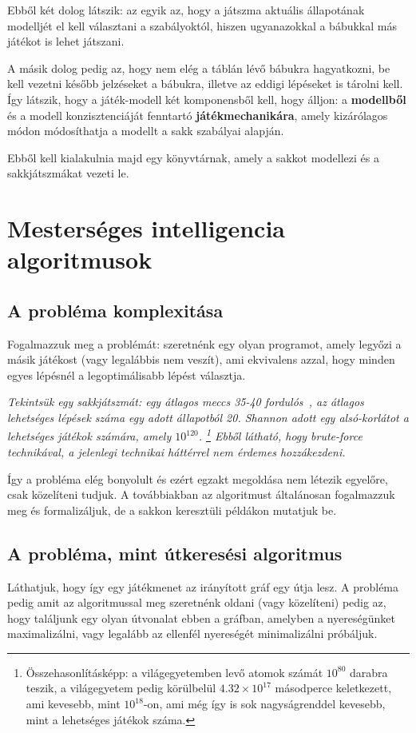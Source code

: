 \documentclass[twoside, a4paper, 12pt]{book}
\begin{document}
Ebből két dolog látszik: az egyik az, hogy a játszma aktuális állapotának modelljét el kell választani a szabályoktól, hiszen ugyanazokkal a bábukkal más játékot is lehet játszani.

A másik dolog pedig az, hogy nem elég a táblán lévő bábukra hagyatkozni, be kell vezetni később jelzéseket a bábukra, illetve az eddigi lépéseket is tárolni kell. Így látszik, hogy a játék-modell két komponensből kell, hogy álljon: a \textbf{modellből} és a modell konzisztenciáját fenntartó \textbf{játékmechanikára}, amely kizárólagos módon módosíthatja a modellt a sakk szabályai alapján.

Ebből kell kialakulnia majd egy könyvtárnak, amely a sakkot modellezi és a sakkjátszmákat vezeti le.

\section{Mesterséges intelligencia algoritmusok}
\subsection{A probléma komplexitása}
Fogalmazzuk meg a problémát: szeretnénk egy olyan programot, amely legyőzi a másik játékost (vagy legalábbis nem veszít), ami ekvivalens azzal, hogy minden egyes lépésnél a legoptimálisabb lépést választja.

\textit{Tekintsük egy sakkjátszmát: egy átlagos meccs 35-40 fordulós~\cite{averageLengthOfChessGame}\cite{averageLengthOfChessGame2}\cite{chessStatistics}, az átlagos lehetséges lépések száma egy adott állapotból 20\cite{shannonnumber}. Shannon adott egy alsó-korlátot a lehetséges játékok számára, amely $10^{120}$. \footnote{Összehasonlításképp: a világegyetemben levő atomok számát $10^{80}$ darabra teszik, a világegyetem pedig körülbelül $4.32 \times 10^{17}$ másodperce keletkezett, ami kevesebb, mint $10^{18}$-on, ami még így is sok nagyságrenddel kevesebb, mint a lehetséges játékok száma.} Ebből látható, hogy \textit{brute-force} technikával, a jelenlegi technikai háttérrel nem érdemes hozzákezdeni.}

Így a probléma elég bonyolult és ezért egzakt megoldása nem létezik egyelőre, csak közelíteni tudjuk. A továbbiakban az algoritmust általánosan fogalmazzuk meg és formalizáljuk, de a sakkon keresztüli példákon mutatjuk be.

\subsection{A probléma, mint útkeresési algoritmus}
Láthatjuk, hogy így egy játékmenet az irányított gráf egy útja lesz. A probléma pedig amit az algoritmussal meg szeretnénk oldani (vagy közelíteni) pedig az, hogy találjunk egy olyan útvonalat ebben a gráfban, amelyben a nyereségünket maximalizálni, vagy legalább az ellenfél nyereségét minimalizálni próbáljuk.
\end{document}
